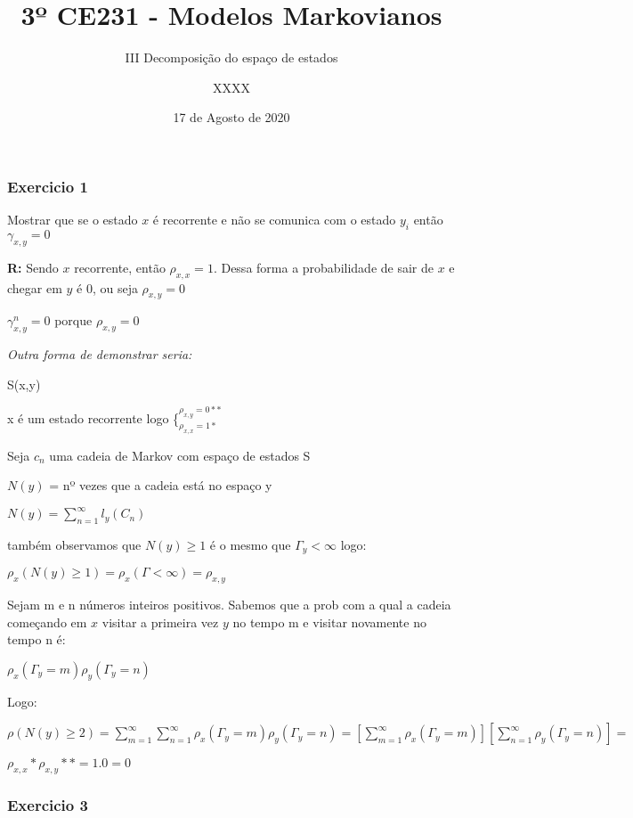 \documentclass[
]{article}
\title{3º CE231 - Modelos Markovianos}
\subtitle{III Decomposição do espaço de estados}
\author{XXXX}
\date{17 de Agosto de 2020}
\begin{document}
\maketitle

\hypertarget{exercicio-1}{%
\subsubsection{Exercicio 1}\label{exercicio-1}}

Mostrar que se o estado \(x\) é recorrente e não se comunica com o
estado \(y_{i}\) então \(\gamma_{x,y} = 0\)

\textbf{R:} Sendo \(x\) recorrente, então \(\rho_{x,x}=1\). Dessa forma
a probabilidade de sair de \(x\) e chegar em \(y\) é 0, ou seja
\(\rho_{x,y}=0\)

\(\gamma_{x,y}^{n} = 0\) porque \(\rho_{x,y}=0\)

\emph{Outra forma de demonstrar seria:}

S(x,y)

x é um estado recorrente logo \{\(_{\rho_{x,x}=1*}^{\rho_{x,y}=0**}\)

Seja \(c_{n}\) uma cadeia de Markov com espaço de estados S

\(N(y)\) = nº vezes que a cadeia está no espaço y

\(N(y)=\sum^{\infty}_{n=1} l_{y}(C_{n})\)

também observamos que \(N(y)\geqslant 1\) é o mesmo que
\(\Gamma_{y}<\infty\) logo:

\(\rho_{x}(N(y)\geqslant 1)=\rho_{x}(\Gamma<\infty)=\rho_{x,y}\)

Sejam m e n números inteiros positivos. Sabemos que a prob com a qual a
cadeia começando em \(x\) visitar a primeira vez \(y\) no tempo m e
visitar novamente no tempo n é:

\(\rho_{x}(\Gamma_{y}=m)\rho_{y}(\Gamma_{y}=n)\)

Logo:

\(\rho(N(y)\geqslant 2) = \sum^{\infty}_{m=1}\sum^{\infty}_{n=1}\rho_{x}(\Gamma_{y}=m)\rho_{y}(\Gamma_{y}=n)=[\sum^{\infty}_{m=1}\rho_{x}(\Gamma_{y}=m)][\sum^{\infty}_{n=1}\rho_{y}(\Gamma_{y}=n)]=\)

\(\rho_{x,x}*\rho_{x,y}**=1.0=0\)

\hypertarget{exercicio-3}{%
\subsubsection{Exercicio 3}\label{exercicio-3}}
\end{document}
